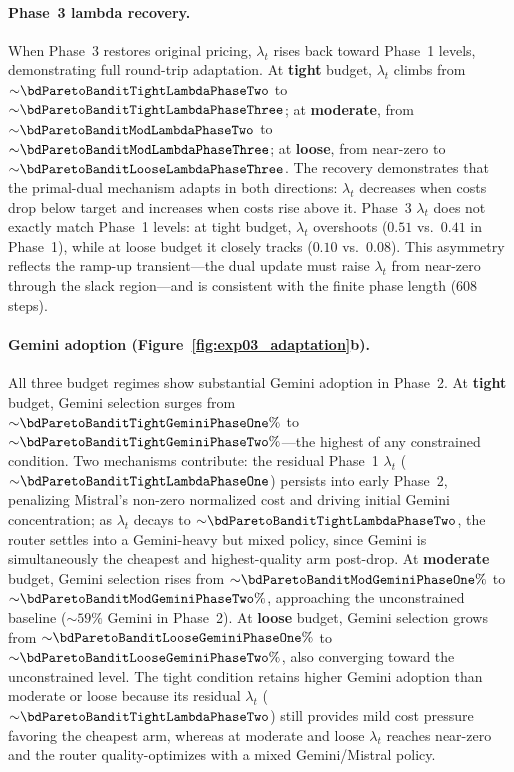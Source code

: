 \paragraph{Phase~3 lambda recovery.}
When Phase~3 restores original pricing, $\lambda_t$ rises back
toward Phase~1 levels, demonstrating full round-trip adaptation.
At \textbf{tight} budget, $\lambda_t$ climbs from
${\sim}\bdParetoBanditTightLambdaPhaseTwo$ to
${\sim}\bdParetoBanditTightLambdaPhaseThree$;
at \textbf{moderate}, from
${\sim}\bdParetoBanditModLambdaPhaseTwo$ to
${\sim}\bdParetoBanditModLambdaPhaseThree$;
at \textbf{loose}, from near-zero to
${\sim}\bdParetoBanditLooseLambdaPhaseThree$.
The recovery demonstrates that the primal-dual mechanism adapts
in both directions: $\lambda_t$ decreases when costs drop below
target and increases when costs rise above it.
Phase~3 $\lambda_t$ does not exactly match Phase~1 levels: at tight
budget, $\lambda_t$ overshoots ($0.51$ vs.\ $0.41$ in Phase~1),
while at loose budget it closely tracks ($0.10$ vs.\ $0.08$).
This asymmetry reflects the ramp-up transient---the dual update must
raise $\lambda_t$ from near-zero through the slack region---and is
consistent with the finite phase length (608 steps).

\paragraph{Gemini adoption (Figure~\ref{fig:exp03_adaptation}b).}
All three budget regimes show substantial Gemini adoption in Phase~2.
At \textbf{tight} budget, Gemini selection surges from
${\sim}\bdParetoBanditTightGeminiPhaseOne\%$ to
${\sim}\bdParetoBanditTightGeminiPhaseTwo\%$---the highest of any
constrained condition.
Two mechanisms contribute: the residual Phase~1 $\lambda_t$
(${\sim}\bdParetoBanditTightLambdaPhaseOne$) persists into early
Phase~2, penalizing Mistral's non-zero normalized cost and driving
initial Gemini concentration; as $\lambda_t$ decays to
${\sim}\bdParetoBanditTightLambdaPhaseTwo$, the router settles into
a Gemini-heavy but mixed policy, since Gemini is simultaneously
the cheapest and highest-quality arm post-drop.
At \textbf{moderate} budget, Gemini selection rises from
${\sim}\bdParetoBanditModGeminiPhaseOne\%$ to
${\sim}\bdParetoBanditModGeminiPhaseTwo\%$, approaching the
unconstrained baseline (${\sim}59\%$ Gemini in Phase~2).
At \textbf{loose} budget, Gemini selection grows from
${\sim}\bdParetoBanditLooseGeminiPhaseOne\%$ to
${\sim}\bdParetoBanditLooseGeminiPhaseTwo\%$, also converging
toward the unconstrained level.
The tight condition retains higher Gemini adoption than moderate or
loose because its residual $\lambda_t$
(${\sim}\bdParetoBanditTightLambdaPhaseTwo$) still provides mild
cost pressure favoring the cheapest arm, whereas at moderate and
loose $\lambda_t$ reaches near-zero and the router quality-optimizes
with a mixed Gemini/Mistral policy.

